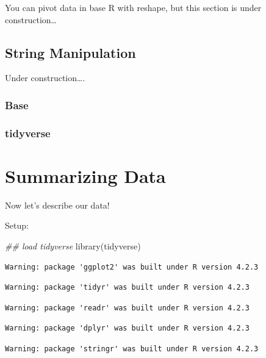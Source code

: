 \documentclass[
  letterpaper,
  DIV=11,
  numbers=noendperiod]{scrreprt}
\newenvironment{Shaded}{\begin{snugshade}}{\end{snugshade}}
\newcommand{\DocumentationTok}[1]{\textcolor[rgb]{0.37,0.37,0.37}{\textit{#1}}}
\newcommand{\FunctionTok}[1]{\textcolor[rgb]{0.28,0.35,0.67}{#1}}
\newcommand{\NormalTok}[1]{\textcolor[rgb]{0.00,0.23,0.31}{#1}}
\begin{document}
You can pivot data in base R with reshape, but this section is under
construction\ldots{}

\section{String Manipulation}\label{string-manipulation}

Under construction\ldots.

\subsection{Base}\label{base-2}

\subsection{tidyverse}\label{tidyverse-1}

\chapter{Summarizing Data}\label{summarizing-data}

Now let's describe our data!

Setup:

\begin{Shaded}
\begin{Highlighting}[]
\DocumentationTok{\#\# load tidyverse}
\FunctionTok{library}\NormalTok{(tidyverse)}
\end{Highlighting}
\end{Shaded}

\begin{verbatim}
Warning: package 'ggplot2' was built under R version 4.2.3
\end{verbatim}

\begin{verbatim}
Warning: package 'tidyr' was built under R version 4.2.3
\end{verbatim}

\begin{verbatim}
Warning: package 'readr' was built under R version 4.2.3
\end{verbatim}

\begin{verbatim}
Warning: package 'dplyr' was built under R version 4.2.3
\end{verbatim}

\begin{verbatim}
Warning: package 'stringr' was built under R version 4.2.3
\end{verbatim}
\end{document}

